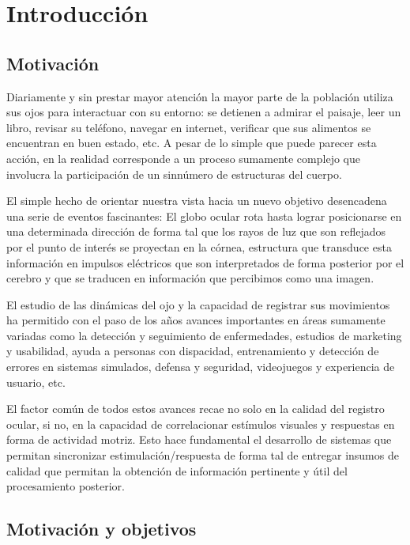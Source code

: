 \documentclass[../main.tex]{subfiles}
\begin{document}
		
\chapter{Introducción}
\label{cha:01_introducción}
	\section{Motivación}
	\label{sec:01_motivacion}

		Diariamente y sin prestar mayor atención la mayor parte de la población utiliza sus ojos para interactuar con su entorno: se detienen a admirar el paisaje, leer un libro, revisar su teléfono, navegar en internet, verificar que sus alimentos se encuentran en buen estado, etc. A pesar de lo simple que puede parecer esta acción, en la realidad corresponde a un proceso sumamente complejo que involucra la participación de un sinnúmero de estructuras del cuerpo. 

		El simple hecho de orientar nuestra vista hacia un nuevo objetivo desencadena una serie de eventos fascinantes: El globo ocular rota hasta lograr posicionarse en una determinada dirección de forma tal que los rayos de luz que son reflejados por el punto de interés se proyectan en la córnea, estructura que transduce esta información en impulsos eléctricos que son interpretados de forma posterior por el cerebro y que se traducen en información que percibimos como una imagen. 

		El estudio de las dinámicas del ojo y la capacidad de registrar sus movimientos ha permitido con el paso de los años avances importantes en áreas sumamente variadas como la detección y seguimiento de enfermedades, estudios de marketing y usabilidad, ayuda a personas con dispacidad, entrenamiento y detección de errores en sistemas simulados, defensa y seguridad, videojuegos y experiencia de usuario, etc.

		El factor común de todos estos avances recae no solo en la calidad del registro ocular, si no, en la capacidad de correlacionar estímulos visuales y respuestas en forma de actividad motriz. Esto hace fundamental el desarrollo de sistemas que permitan sincronizar estimulación/respuesta de forma tal de entregar insumos de calidad que permitan la obtención de información pertinente y útil del procesamiento posterior.  

	\section{Motivación y objetivos}
	\label{sec:01_motivacón_y_objetivos}
\end{document}
